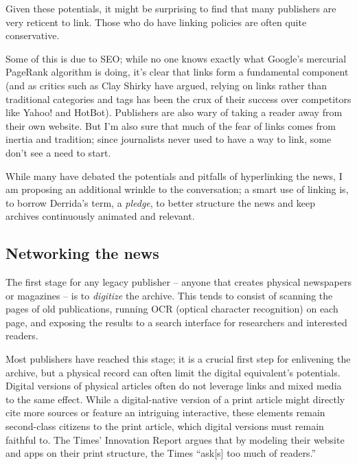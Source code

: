 Given these potentials, it might be surprising to find that many publishers are very reticent to link. Those who do have linking policies are often quite conservative. %

Some of this is due to SEO; while no one knows exactly what Google's mercurial PageRank algorithm is doing, it's clear that links form a fundamental component (and as critics such as Clay Shirky have argued, relying on links rather than traditional categories and tags has been the crux of their success over competitors like Yahoo! and HotBot).\autocite{} Publishers are also wary of taking a reader away from their own website. But I'm also sure that much of the fear of links comes from inertia and tradition; since journalists never used to have a way to link, some don't see a need to start.

While many have debated the potentials and pitfalls of hyperlinking the news, I am proposing an additional wrinkle to the conversation; a smart use of linking is, to borrow Derrida's term, a \emph{pledge}, to better structure the news and keep archives continuously animated and relevant.

\subsection{Networking the news}

The first stage for any legacy publisher -- anyone that creates physical newspapers or magazines -- is to \emph{digitize} the archive. This tends to consist of scanning the pages of old publications, running OCR (optical character recognition) on each page, and exposing the results to a search interface for researchers and interested readers.

Most publishers have reached this stage; it is a crucial first step for enlivening the archive, but a physical record can often limit the digital equivalent's potentials. Digital versions of physical articles often do not leverage links and mixed media to the same effect. While a digital-native version of a print article might directly cite more sources or feature an intriguing interactive, these elements remain second-class citizens to the print article, which digital versions must remain faithful to. The Times' Innovation Report argues that by modeling their website and apps on their print structure, the Times ``ask[s] too much of readers.''

